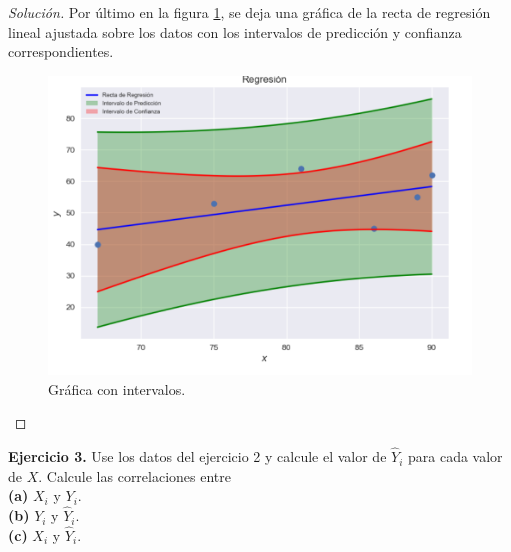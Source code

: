 \documentclass[10.5pt,notitlepage]{article}
\newenvironment{solucion}
  {\begin{proof}[Solución]}
  {\end{proof}}
\begin{document}
\begin{solucion}
Por último en la figura \ref{fig:RLineal3}, se deja una gráfica de la recta de regresión lineal ajustada sobre los datos con los intervalos de predicción y confianza correspondientes. 
\begin{figure}[htb]
\centering
\includegraphics[scale = 0.6]{Relación lineal 3.png}
\caption{Gráfica con intervalos.}
\label{fig:RLineal3}
\end{figure}

\end{solucion}




\noindent \textbf{Ejercicio 3.} Use los datos del ejercicio 2 y calcule el valor de \(\hat{Y}_i\) para cada valor de \(X\). Calcule las correlaciones entre\\

\noindent\textbf{(a)} \(X_i\) y \(Y_i\). \\

\noindent\textbf{(b)} \(Y_i\) y \(\hat{Y}_i\).\\

\noindent\textbf{(c)} \(X_i\) y \(\hat{Y}_i\).\\
\end{document}
